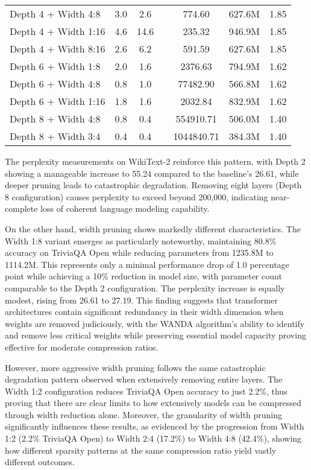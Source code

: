 {\begin{table}[htbp]
\begin{tabular}{lcccccc}
Depth 4 + Width 4:8 & 3.0 & 2.6 & & 774.60 & 627.6M & 1.85 \\
Depth 4 + Width 1:16 & 4.6 & 14.6 & & 235.32 & 946.9M & 1.85 \\
Depth 4 + Width 8:16 & 2.6 & 6.2 & & 591.59 & 627.6M & 1.85 \\
Depth 6 + Width 1:8 & 2.0 & 1.6 & & 2376.63 & 794.9M & 1.62 \\
Depth 6 + Width 4:8 & 0.8 & 1.0 & & 77482.90 & 566.8M & 1.62 \\
Depth 6 + Width 1:16 & 1.8 & 1.6 & & 2032.84 & 832.9M & 1.62 \\
Depth 8 + Width 4:8 & 0.8 & 0.4 & & 554910.71 & 506.0M & 1.40 \\
Depth 8 + Width 3:4 & 0.4 & 0.4 & & 1044840.71 & 384.3M & 1.40 \\

\hline
\end{tabular}
\end{table}
}

The perplexity measurements on WikiText-2 reinforce this pattern, with Depth 2 showing a manageable increase to 55.24 compared to the baseline's 26.61, while deeper pruning leads to catastrophic degradation. Removing eight layers (Depth 8 configuration) causes perplexity to exceed beyond 200,000, indicating near-complete loss of coherent language modeling capability.

On the other hand, width pruning shows markedly different characteristics. The Width 1:8 variant emerges as particularly noteworthy, maintaining 80.8\% accuracy on TriviaQA Open while reducing parameters from 1235.8M to 1114.2M. This represents only a minimal performance drop of 1.0 percentage point while achieving a 10\% reduction in model size, with parameter count comparable to the Depth 2 configuration. The perplexity increase is equally modest, rising from 26.61 to 27.19. This finding suggests that transformer architectures contain significant redundancy in their width dimension when weights are removed judiciously, with the WANDA algorithm's ability to identify and remove less critical weights while preserving essential model capacity proving effective for moderate compression ratios.

However, more aggressive width pruning follows the same catastrophic degradation pattern observed when extensively removing entire layers. The Width 1:2 configuration reduces TriviaQA Open accuracy to just 2.2\%, thus proving that there are clear limits to how extensively models can be compressed through width reduction alone.
Moreover, the granularity of width pruning significantly influences these results, as evidenced by the progression from Width 1:2 (2.2\% TriviaQA Open) to Width 2:4 (17.2\%) to Width 4:8 (42.4\%), showing how different sparsity patterns at the same compression ratio yield vastly different outcomes.

